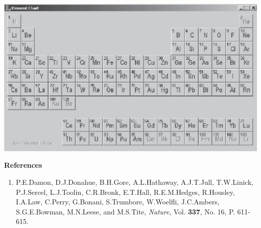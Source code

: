\begin{center}
\includegraphics[width=5.5in]{radiocarbon_dating/pertable3_bw.eps}
\end{center}

\textbf{References}

\begin{enumerate}
\item P.E.Damon, D.J.Donahue, B.H.Gore, A.L.Hathaway, A.J.T.Jull, T.W.Linick,
P.J.Sercel, L.J.Toolin, C.R.Bronk, E.T.Hall, R.E.M.Hedges, R.Housley,
I.A.Law, C.Perry, G.Bonani, S.Trumbore, W.Woelfli, J.C.Ambers, S.G.E.Bowman,
M.N.Leese, and M.S.Tite, \emph{Nature}, Vol. \textbf{337}, No. 16,
P. 611-615.\end{enumerate}

